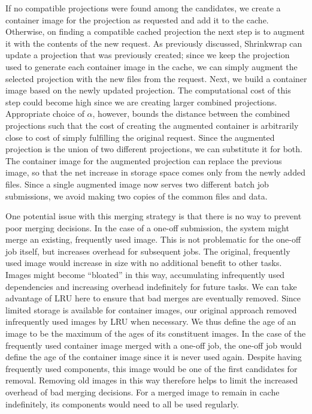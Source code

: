 \documentclass[conference]{IEEEtran}
\begin{document}
If no compatible projections were found among the candidates,
we create a container image for the projection as requested and add it to the cache.
Otherwise, on finding a compatible cached projection the next step is to augment it with the contents of the new request.
As previously discussed,
Shrinkwrap can update a projection that was previously created;
since we keep the projection used to generate each container image in the cache,
we can simply augment the selected projection with the new files from the request.
Next, we build a container image based on the newly updated projection.
The computational cost of this step could become high since we are creating larger combined projections.
Appropriate choice of $\alpha$, however,
bounds the distance between the combined projections such that the cost of creating the augmented container is arbitrarily close to cost of simply fulfilling the original request.
Since the augmented projection is the union of two different projections,
we can substitute it for both.
The container image for the augmented projection can replace the previous image,
so that the net increase in storage space comes only from the newly added files.
Since a single augmented image now serves two different batch job submissions,
we avoid making two copies of the common files and data.

One potential issue with this merging strategy is that there is no way to prevent poor merging decisions.
In the case of a one-off submission,
the system might merge an existing, frequently used image.
This is not problematic for the one-off job itself,
but increases overhead for subsequent jobs.
The original, frequently used image would increase in size with no additional benefit to other tasks.
Images might become ``bloated'' in this way,
accumulating infrequently used dependencies and increasing overhead indefinitely for future tasks.
We can take advantage of LRU here to ensure that bad merges are eventually removed.
Since limited storage is available for container images,
our original approach removed infrequently used images by LRU when necessary.
We thus define the age of an image to be the maximum of the ages of its constituent images.
In the case of the frequently used container image merged with a one-off job,
the one-off job would define the age of the container image since it is never used again.
Despite having frequently used components,
this image would be one of the first candidates for removal.
Removing old images in this way therefore helps to limit the increased overhead of bad merging decisions.
For a merged image to remain in cache indefinitely,
its components would need to all be used regularly.
\end{document}
